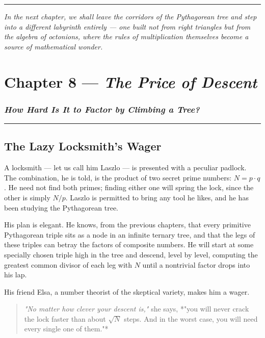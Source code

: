 \documentclass[12pt, letterpaper, openany]{book}
\theoremstyle{definition}
\theoremstyle{remark}
\begin{document}
\bigskip\noindent\rule{\textwidth}{0.4pt}\bigskip


\textit{In the next chapter, we shall leave the corridors of the Pythagorean tree and step into a different labyrinth entirely --- one built not from right triangles but from the algebra of octonions, where the rules of multiplication themselves become a source of mathematical wonder.}


\clearpage

\chapter{Chapter 8 --- \textit{The Price of Descent}}



\subsection*{\textit{How Hard Is It to Factor by Climbing a Tree?}}



\bigskip\noindent\rule{\textwidth}{0.4pt}\bigskip



\section*{The Lazy Locksmith's Wager}


A locksmith --- let us call him Laszlo --- is presented with a peculiar padlock. The combination, he is told, is the product of two secret prime numbers: $N = p \cdot q$. He need not find both primes; finding either one will spring the lock, since the other is simply $N / p$. Laszlo is permitted to bring any tool he likes, and he has been studying the Pythagorean tree.

His plan is elegant. He knows, from the previous chapters, that every primitive Pythagorean triple sits as a node in an infinite ternary tree, and that the legs of these triples can betray the factors of composite numbers. He will start at some specially chosen triple high in the tree and descend, level by level, computing the greatest common divisor of each leg with $N$ until a nontrivial factor drops into his lap.

His friend Elsa, a number theorist of the skeptical variety, makes him a wager.


\begin{quote}
\textit{"No matter how clever your descent is,"} she says, *"you will never crack the lock faster than about $\sqrt{N}$ steps. And in the worst case, you will need every single one of them."*
\end{quote}
\end{document}
